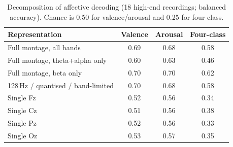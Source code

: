 \begin{table}[t]
  \centering
  \caption{Decomposition of affective decoding (18 high-end recordings; balanced
  accuracy). Chance is 0.50 for valence/arousal and 0.25 for four-class.}
  \label{tab:decomp}
  \begin{tabular}{lccc}
    \hline
    Representation & Valence & Arousal & Four-class \\
    \hline
    Full montage, all bands & 0.69 & 0.68 & 0.58 \\
    Full montage, theta+alpha only & 0.60 & 0.63 & 0.46 \\
    Full montage, beta only & 0.70 & 0.70 & 0.62 \\
    128\,Hz / quantised / band-limited & 0.70 & 0.68 & 0.58 \\
    Single Fz & 0.52 & 0.56 & 0.34 \\
    Single Cz & 0.51 & 0.56 & 0.38 \\
    Single Pz & 0.52 & 0.56 & 0.33 \\
    Single Oz & 0.53 & 0.57 & 0.35 \\
    \hline
  \end{tabular}
\end{table}
